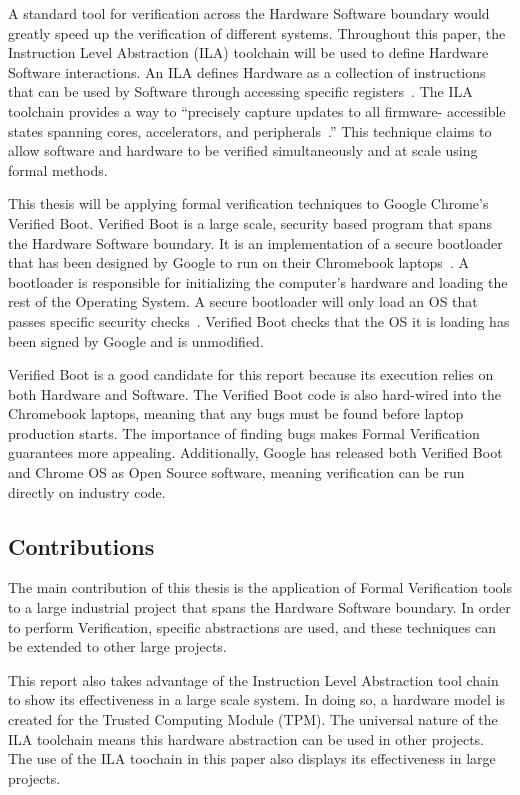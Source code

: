 A standard tool for verification across the Hardware Software boundary would
greatly speed up the verification of different systems.
Throughout this paper, the  Instruction Level Abstraction (ILA) toolchain will be used to define Hardware Software interactions.
An ILA defines Hardware as a collection of instructions that can be used by
Software through accessing specific registers~\cite{ila}.
The ILA toolchain provides a way to ``precisely capture updates to all firmware-
accessible states spanning cores, accelerators, and peripherals~\cite{ila-template}.''
This technique claims to allow software and hardware to be verified simultaneously and at scale using formal methods.

This thesis will be applying formal verification techniques to Google Chrome's
Verified Boot.
Verified Boot is a large scale, security based program that spans the Hardware
Software boundary. 
It is an implementation of a secure bootloader that has been designed by Google to run on their Chromebook laptops~\cite{vboot}.
A bootloader is responsible for initializing the computer's hardware and
loading the rest of the Operating System.
A secure bootloader will only load an OS that passes specific
security checks~\cite{secure-bootloader}.
Verified Boot checks that the OS it is loading has been signed by Google and is
unmodified.

Verified Boot is a good candidate for this report because its execution relies
on both Hardware and Software.
The Verified Boot code is also hard-wired into the Chromebook laptops, meaning
that any bugs must be found before laptop production starts.
The importance of finding bugs makes Formal Verification guarantees more appealing.
Additionally, Google has released both Verified Boot and Chrome OS as Open
Source software, meaning verification can be run directly on industry code.

\subsection{Contributions}

The main contribution of this thesis is the application of Formal Verification
tools to a large industrial project that spans the Hardware Software boundary.
In order to perform Verification, specific abstractions are used, and these
techniques can be extended to other large projects.

This report also takes advantage of the Instruction Level Abstraction tool chain
to show its effectiveness in a large scale system.
In doing so, a hardware model is created for the Trusted Computing
Module (TPM).
The universal nature of the ILA toolchain means this hardware abstraction can be used in other projects.
The use of the ILA toochain in this paper also displays its effectiveness in large projects.

